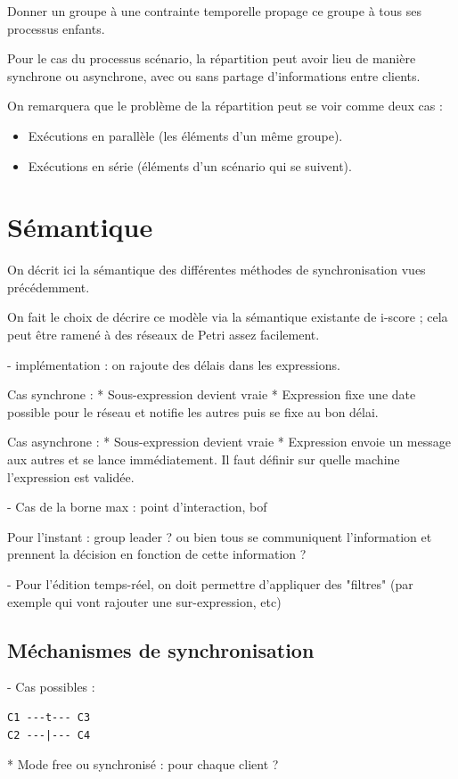 \documentclass{article}
\newcommand\trigger{point d'interaction\xspace}
\begin{document}
Donner un groupe à une contrainte temporelle propage ce groupe à tous ses processus enfants.

Pour le cas du processus scénario, la répartition peut avoir lieu de manière synchrone ou asynchrone, 
avec ou sans partage d'informations entre clients.

On remarquera que le problème de la répartition peut se voir comme deux cas : 
\begin{itemize}
	\item Exécutions en parallèle (les éléments d'un même groupe).
	\item Exécutions en série (éléments d'un scénario qui se suivent).
\end{itemize}

\section{Sémantique}\label{sec.semantique}
On décrit ici la sémantique des différentes méthodes de synchronisation vues précédemment.

On fait le choix de décrire ce modèle via la sémantique existante de i-score ; cela peut être ramené à des réseaux de Petri assez facilement.



- implémentation : on rajoute des délais dans les expressions.

Cas synchrone : 
* Sous-expression devient vraie
* Expression fixe une date possible pour le réseau et notifie les autres puis se fixe au bon délai.

Cas asynchrone : 
* Sous-expression devient vraie
* Expression envoie un message aux autres et se lance immédiatement.
Il faut définir sur quelle machine l'expression est validée.

- Cas de la borne max : \trigger, bof

Pour l'instant : group leader ? ou bien tous se communiquent l'information et prennent la décision en fonction de cette information ?

- Pour l'édition temps-réel, on doit permettre d'appliquer des "filtres" (par exemple qui vont rajouter une sur-expression, etc)
\subsection{Méchanismes de synchronisation}
- Cas possibles : 

\begin{lstlisting}
C1 ---t--- C3
C2 ---|--- C4
\end{lstlisting}
* Mode free ou synchronisé : pour chaque client ? 
\end{document}
